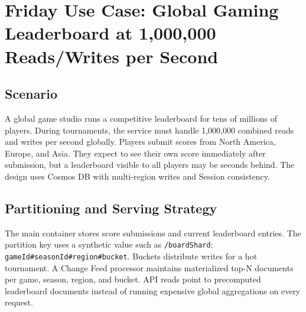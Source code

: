 \section{Friday Use Case: Global Gaming Leaderboard at 1,000,000 Reads/Writes per Second}

\subsection{Scenario}
A global game studio runs a competitive leaderboard for tens of millions of players. During tournaments, the service must handle 1,000,000 combined reads and writes per second globally. Players submit scores from North America, Europe, and Asia. They expect to see their own score immediately after submission, but a leaderboard visible to all players may be seconds behind. The design uses Cosmos DB with multi-region writes and Session consistency.

\subsection{Partitioning and Serving Strategy}
The main container stores score submissions and current leaderboard entries. The partition key uses a synthetic value such as \texttt{/boardShard}: \texttt{gameId\#seasonId\#region\#bucket}. Buckets distribute writes for a hot tournament. A Change Feed processor maintains materialized top-N documents per game, season, region, and bucket. API reads point to precomputed leaderboard documents instead of running expensive global aggregations on every request.

